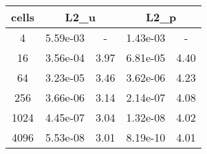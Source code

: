 \documentclass[10pt]{report}
\begin{document}
\begin{table}[H]
\begin{center}
\begin{tabular}{|c|c|c|c|c|} \hline
cells & 
\multicolumn{2}{|c|}{L2_u} & 
\multicolumn{2}{|c|}{L2_p}\\ \hline
4 & 5.59e-03 & - & 1.43e-03 & -\\ \hline
16 & 3.56e-04 & 3.97 & 6.81e-05 & 4.40\\ \hline
64 & 3.23e-05 & 3.46 & 3.62e-06 & 4.23\\ \hline
256 & 3.66e-06 & 3.14 & 2.14e-07 & 4.08\\ \hline
1024 & 4.45e-07 & 3.04 & 1.32e-08 & 4.02\\ \hline
4096 & 5.53e-08 & 3.01 & 8.19e-10 & 4.01\\ \hline
\end{tabular}
\end{center}
\end{table}
\end{document}
